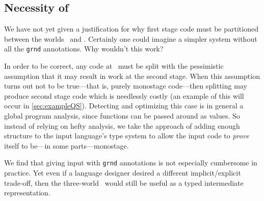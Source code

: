 \begin{abstrsyn}
\subsection {Necessity of \bbonep}
\label{sec:needGround}

We have not yet given a justification for why first stage code must be
partitioned between the worlds \bbonem\ and \bbonep.
Certainly one could imagine a simpler system without all the \texttt{grnd} annotations.  
Why wouldn't this work?

In order to be correct, any code at \bbonem\ must be split with the 
pessimistic assumption that it may result in work at the second stage.
When this assumption turns out not to be true---that is, purely monostage code---then 
splitting may produce second stage code which is needlessly costly 
(an example of this will occur in \ref{sec:exampleQS}).
Detecting and optimizing this case is in general a global program analysis,
since functions can be passed around as values.  
So instead of relying on hefty analysis, 
we take the approach of adding enough structure to the input language's type system to
allow the input code to {\em prove} itself to be---in some parts---monostage.

We find that giving input with \texttt{grnd} annotations is not especially cumbersome in practice.
Yet even if a language designer desired a different implicit/explicit trade-off,
then the three-world \lang\ would still be useful as a typed intermediate representation.

\end{abstrsyn}



